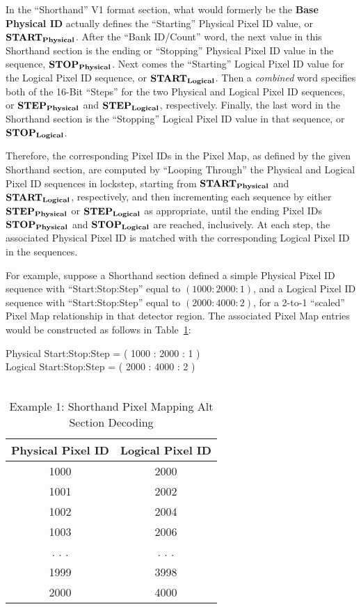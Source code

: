 In the ``Shorthand'' V1 format section,
what would formerly be the {\bf Base Physical ID} actually defines
the ``Starting'' Physical Pixel ID value, or ${\bf START_{Physical}}$.
After the ``Bank ID/Count'' word, the next value in this Shorthand section
is the ending or ``Stopping'' Physical Pixel ID value in the sequence,
${\bf STOP_{Physical}}$.
Next comes the ``Starting'' Logical Pixel ID value
for the Logical Pixel ID sequence, or ${\bf START_{Logical}}$.
Then a {\it combined} word specifies both of the 16-Bit ``Steps''
for the two Physical and Logical Pixel ID sequences,
or ${\bf STEP_{Physical}}$ and ${\bf STEP_{Logical}}$,
respectively.
Finally, the last word in the Shorthand section
is the ``Stopping'' Logical Pixel ID value in that sequence,
or ${\bf STOP_{Logical}}$.

Therefore, the corresponding Pixel IDs in the Pixel Map,
as defined by the given Shorthand section,
are computed by ``Looping Through'' the Physical and Logical
Pixel ID sequences in lockstep,
starting from ${\bf START_{Physical}}$ and ${\bf START_{Logical}}$,
respectively,
and then incrementing each sequence
by either ${\bf STEP_{Physical}}$ or ${\bf STEP_{Logical}}$ as appropriate,
until the ending Pixel IDs ${\bf STOP_{Physical}}$
and ${\bf STOP_{Logical}}$ are reached, inclusively.
At each step, the associated Physical Pixel ID
is matched with the corresponding Logical Pixel ID in the sequences.

For example,
suppose a Shorthand section defined a simple Physical Pixel ID sequence
with ``Start:Stop:Step'' equal to $ ( 1000 : 2000 : 1 ) $,
and a Logical Pixel ID sequence
with ``Start:Stop:Step'' equal to $ ( 2000 : 4000 : 2 ) $,
for a 2-to-1 ``scaled'' Pixel Map relationship in that detector region.
The associated Pixel Map entries would be constructed as follows
in Table~\ref{table:ex1_shorthand_pixel_map_alt_section_decode}:

\begin{table}[h]
  \begin{center}
	Physical Start:Stop:Step = ( 1000 : 2000 : 1 ) \\
	Logical Start:Stop:Step = ( 2000 : 4000 : 2 ) \\
	~ \\
    \begin{tabular}{c | c}
	Physical Pixel ID & Logical Pixel ID \\
	\hline
	1000 & 2000 \\
	1001 & 2002 \\
	1002 & 2004 \\
	1003 & 2006 \\
	. . . & . . . \\
	1999 & 3998 \\
	2000 & 4000 \\
    \end{tabular}
  \end{center}
  \caption {Example 1: Shorthand Pixel Mapping Alt Section Decoding}
  \label{table:ex1_shorthand_pixel_map_alt_section_decode}
\end{table}

